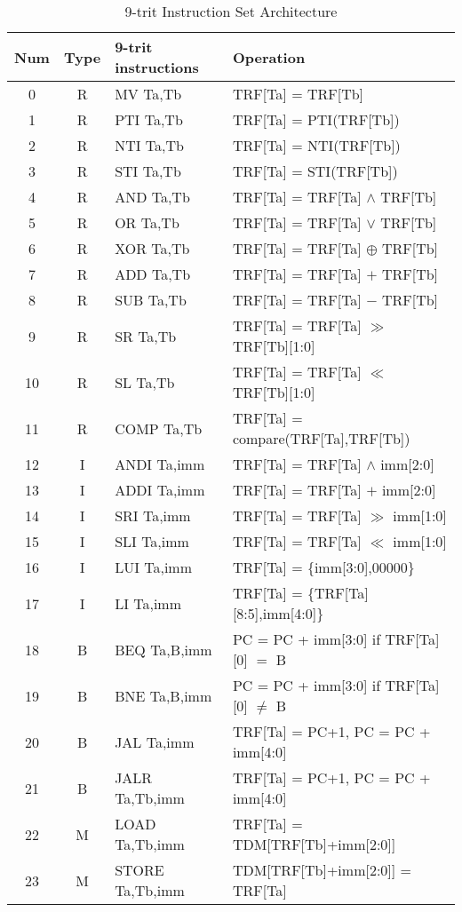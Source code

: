 \documentclass[12pt]{article}
\begin{document}
\begin{table}[h]
    \begin{tabular}{|c|c|l|l|}
    \hline
    Num & Type & 9-trit instructions & Operation \\
    \hline
    0 & R & MV Ta,Tb & TRF[Ta] = TRF[Tb] \\
    1 & R & PTI Ta,Tb & TRF[Ta] = PTI(TRF[Tb]) \\
    2 & R & NTI Ta,Tb & TRF[Ta] = NTI(TRF[Tb]) \\
    3 & R & STI Ta,Tb & TRF[Ta] = STI(TRF[Tb]) \\
    4 & R & AND Ta,Tb & TRF[Ta] = TRF[Ta] $\wedge$ TRF[Tb] \\
    5 & R & OR Ta,Tb & TRF[Ta] = TRF[Ta] $\vee$ TRF[Tb] \\
    6 & R & XOR Ta,Tb & TRF[Ta] = TRF[Ta] $\oplus$ TRF[Tb] \\
    7 & R & ADD Ta,Tb & TRF[Ta] = TRF[Ta] $+$ TRF[Tb] \\
    8 & R & SUB Ta,Tb & TRF[Ta] = TRF[Ta] $-$ TRF[Tb] \\
    9 & R & SR Ta,Tb & TRF[Ta] = TRF[Ta] $\gg$ TRF[Tb][1:0] \\
    10 & R & SL Ta,Tb & TRF[Ta] = TRF[Ta] $\ll$ TRF[Tb][1:0] \\
    11 & R & COMP Ta,Tb & TRF[Ta] = compare(TRF[Ta],TRF[Tb]) \\
    12 & I & ANDI Ta,imm & TRF[Ta] = TRF[Ta] $\wedge$ imm[2:0] \\
    13 & I & ADDI Ta,imm & TRF[Ta] = TRF[Ta] $+$ imm[2:0] \\
    14 & I & SRI Ta,imm & TRF[Ta] = TRF[Ta] $\gg$ imm[1:0] \\
    15 & I & SLI Ta,imm & TRF[Ta] = TRF[Ta] $\ll$ imm[1:0] \\
    16 & I & LUI Ta,imm & TRF[Ta] = \{imm[3:0],00000\} \\
    17 & I & LI Ta,imm & TRF[Ta] = \{TRF[Ta][8:5],imm[4:0]\} \\
    18 & B & BEQ Ta,B,imm & PC = PC + imm[3:0] if TRF[Ta][0] $=$ B \\
    19 & B & BNE Ta,B,imm & PC = PC + imm[3:0] if TRF[Ta][0] $\neq$ B \\
    20 & B & JAL Ta,imm & TRF[Ta] = PC+1, PC = PC + imm[4:0] \\
    21 & B & JALR Ta,Tb,imm & TRF[Ta] = PC+1, PC = PC + imm[4:0] \\
    22 & M & LOAD Ta,Tb,imm & TRF[Ta] = TDM[TRF[Tb]+imm[2:0]] \\
    23 & M & STORE Ta,Tb,imm & TDM[TRF[Tb]+imm[2:0]] = TRF[Ta] \\
    \hline
    \end{tabular}
    \caption{9-trit Instruction Set Architecture}
\end{table}
\end{document}
